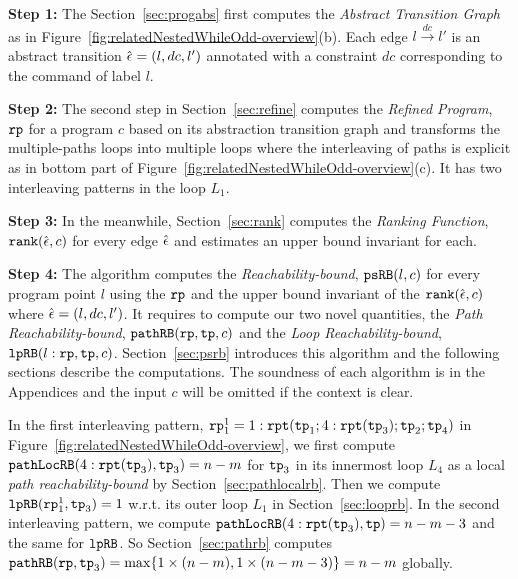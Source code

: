 
\textbf{Step 1: }
The Section~\ref{sec:progabs} first 
computes the \emph{Abstract Transition Graph} as in Figure~\ref{fig:relatedNestedWhileOdd-overview}(b).
Each edge $l \xrightarrow{dc} l'$ is an abstract transition $\hat{\mathtt{\epsilon}{}} = (l, dc, l')$ annotated with a constraint $dc$ corresponding to the command of label $l$.

\textbf{Step 2: }
The second step in Section~\ref{sec:refine}
computes the \emph{Refined Program}, $\mathtt{rp}$ for a program $c$ based on 
its abstraction transition graph and transforms the multiple-paths loops
into multiple loops where
the interleaving of paths is explicit as in bottom part of Figure~\ref{fig:relatedNestedWhileOdd-overview}(c).
It has two interleaving patterns in the loop $L_1$.

\textbf{Step 3: }
In the meanwhile, Section~\ref{sec:rank} computes the \emph{Ranking Function}, $\mathtt{rank}(\hat{\mathtt{\epsilon}{}}, c)$ 
for every edge $\hat{\mathtt{\epsilon}{}}$ 
and estimates an upper bound invariant for each.

\textbf{Step 4: }
The algorithm computes the \emph{Reachability-bound}, $\mathtt{psRB}(l, c)$ for every program point $l$ using the $\mathtt{rp}$ and the upper bound invariant of the $\mathtt{rank}(\hat{\mathtt{\epsilon}{}}, c)$ where $\hat{\mathtt{\epsilon}{}} = (l,dc,l')$.
It requires to compute our two novel quantities, the \emph{Path Reachability-bound}, $\mathtt{pathRB}(\mathtt{rp}, \mathtt{tp}, c)$ and the \emph{Loop Reachability-bound}, $\mathtt{lpRB}(l: \mathtt{rp}, \mathtt{tp}, c)$.
Section~\ref{sec:psrb} introduces this algorithm and the following sections describe the computations. 
The soundness of each algorithm is in the Appendices and the input $c$ will be omitted if the context is clear.

In the first interleaving pattern, $\mathtt{rp}_1^1 = 1: \mathtt{rpt}(\mathtt{tp}_1; 4:\mathtt{rpt}(\mathtt{tp}_3); \mathtt{tp}_2; \mathtt{tp}_4)$ in Figure~\ref{fig:relatedNestedWhileOdd-overview},
we first compute $\mathtt{pathLocRB}(4:\mathtt{rpt}(\mathtt{tp}_3), \mathtt{tp}_3) = n - m$
 for $\mathtt{tp}_3$ in its innermost loop $L_4$ as a local \emph{path reachability-bound} by Section~\ref{sec:pathlocalrb}.
Then we compute $\mathtt{lpRB}(\mathtt{rp}_1^1, \mathtt{tp}_3) = 1$ w.r.t. its outer loop $L_1$ in Section~\ref{sec:looprb}. In the second interleaving pattern, we compute $\mathtt{pathLocRB}(4:\mathtt{rpt}(\mathtt{tp}_3), \mathtt{tp}) = n - m - 3$ and the same for $\mathtt{lpRB}$.
So Section~\ref{sec:pathrb} computes $\mathtt{pathRB}(\mathtt{rp}, \mathtt{tp}_3) = \max\{ 1 \times (n - m), 1 \times (n - m - 3) \} = n - m$ globally.

